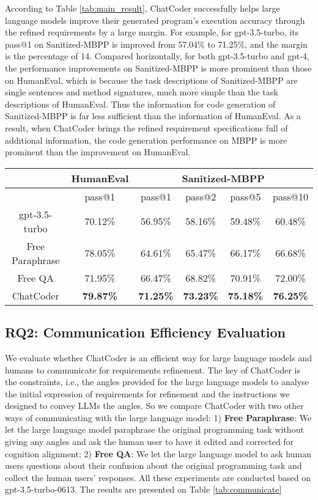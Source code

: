 \documentclass[sigconf]{acmart}
\begin{document}
According to Table \ref{tab:main_result}, ChatCoder successfully helps large language models improve their generated program's execution accuracy through the refined requirements by a large margin. For example, for gpt-3.5-turbo, its pass@1 on Sanitized-MBPP is improved from 57.04\% to 71.25\%, and the margin is the percentage of 14. Compared horizontally, for both gpt-3.5-turbo and gpt-4, the performance improvements on Sanitized-MBPP is more prominent than those on HumanEval, which is because the task descriptions of Sanitized-MBPP are single sentences and method signatures, much more simple than the task descriptions of HumanEval. Thus the information for code generation of Sanitized-MBPP is far less sufficient than the information of HumanEval. As a result, when ChatCoder brings the refined requirement specifications full of additional information, the code generation performance on MBPP is more prominent than the improvement on HumanEval.

\begin{table*}[htbp]
    \centering
    \caption{Communication Efficiency Comparison}
    \begin{tabular}{c c | c  c  c c}
    \toprule
     & HumanEval & \multicolumn{4}{c}{Sanitized-MBPP} \\
     \midrule
     & pass@1 & pass@1 & pass@2 & pass@5 & pass@10\\
     \midrule
     gpt-3.5-turbo & 70.12\% & 56.95\% & 58.16\% & 59.48\% & 60.48\% \\
     \midrule
     Free Paraphrase & 78.05\% & 64.61\% & 65.47\% & 66.17\% & 66.68\%\\
     Free QA & 71.95\% & 66.47\% & 68.82\% & 70.91\% & 72.00\% \\
     \midrule
     ChatCoder & \textbf{79.87\%} &\textbf{ 71.25\%} & \textbf{73.23\%} & \textbf{75.18\%} & \textbf{76.25\%} \\
     \bottomrule
    \end{tabular}
    
    \label{tab:communicate}
\end{table*}

\subsection{RQ2: Communication Efficiency Evaluation}
We evaluate whether ChatCoder is an efficient way for large language models and humans to communicate for requirements refinement. The key of ChatCoder is the constraints, i.e., the angles provided for the large language models to analyse the initial expression of requirements for refinement and the instructions we designed to convey LLMs the angles. So we compare ChatCoder with two other ways of communicating with the large language model: 1) \textbf{Free Paraphrase}: We let the large language model paraphrase the original programming task without giving any angles and ask the human user to have it edited and corrected for cognition alignment; 2) \textbf{Free QA}: We let the large language model to ask human users questions about their confusion about the original programming task and collect the human users' responses. All these experiments are conducted based on gpt-3.5-turbo-0613. The results are presented on Table \ref{tab:communicate}
\end{document}
